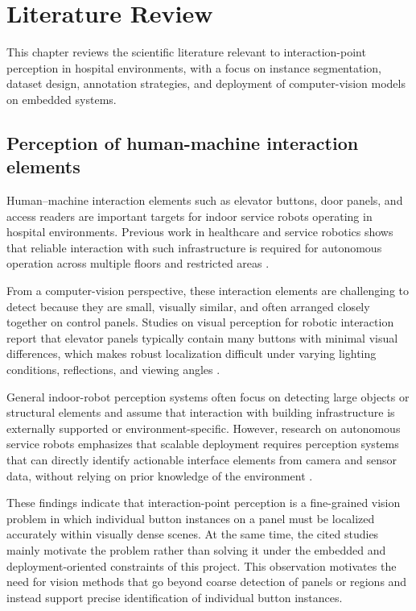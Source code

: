 \chapter{Literature Review}
\label{ch:literature}
This chapter reviews the scientific literature relevant to interaction-point
perception in hospital environments, with a focus on instance segmentation,
dataset design, annotation strategies, and deployment of computer-vision models
on embedded systems.

\section{Perception of human-machine interaction elements}

Human--machine interaction elements such as elevator buttons, door panels, and
access readers are important targets for indoor service robots operating in
hospital environments. Previous work in healthcare and service robotics shows
that reliable interaction with such infrastructure is required for autonomous
operation across multiple floors and restricted areas
\citep{holland2021servicerobots,masala2025assistiverobotics}.

From a computer-vision perspective, these interaction elements are challenging
to detect because they are small, visually similar, and often arranged closely
together on control panels. Studies on visual perception for robotic interaction
report that elevator panels typically contain many buttons with minimal visual
differences, which makes robust localization difficult under varying lighting
conditions, reflections, and viewing angles \citep{bernard2020interfaces}.

General indoor-robot perception systems often focus on detecting large objects
or structural elements and assume that interaction with building infrastructure
is externally supported or environment-specific. However, research on autonomous
service robots emphasizes that scalable deployment requires perception systems
that can directly identify actionable interface elements from camera and sensor data,
without relying on prior knowledge of the environment
\citep{wang2019indoorrobots}.

These findings indicate that interaction-point perception is a fine-grained
vision problem in which individual button instances on a panel must be localized
accurately within visually dense scenes. At the same time, the cited studies
mainly motivate the problem rather than solving it under the embedded and
deployment-oriented constraints of this project. This observation motivates the
need for vision methods that go beyond coarse detection of panels or regions and
instead support precise identification of individual button instances.


